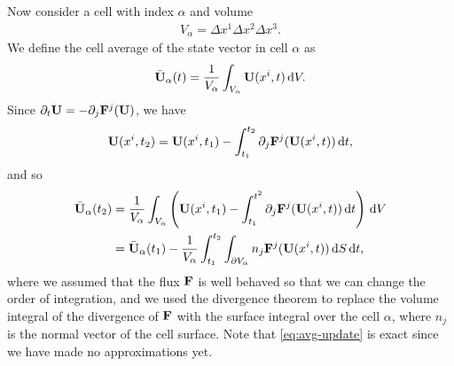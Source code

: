\documentclass{article}
\begin{document}
\newcommand{\dv}{\,\mathrm{d}V}
\newcommand{\ds}{\,\mathrm{d}S}
\newcommand{\dt}{\,\mathrm{d}t}

Now consider a cell with index $\alpha$ and volume
\begin{align}
  V_\alpha = \Delta x^1 \Delta x^2 \Delta x^3.
\end{align}
We define the cell average of the state vector in cell $\alpha$ as
\begin{align}
  \label{eq:cell-average}
  \bar{\vc U}_\alpha(t) = \frac{1}{V_\alpha} \int_{V_\alpha} \vc U(x^i,t) \dv.
\end{align}
Since $\partial_t \mathrm{\bf U} = -\partial_j\mathrm{\bf F}^j(\mathrm{\bf U})$, we have
\begin{align}
  \vc U(x^i,t_2) = \vc U(x^i, t_1) - \int_{t_1}^{t_2} \partial_j \vc F^j(\vc U(x^i,t)) \dt,
\end{align}
and so
\begin{align}
  \label{eq:avg-update}
  \bar{\vc U}_\alpha(t_2) &= \frac{1}{V_\alpha}\int_{V_\alpha} \left( \vc U(x^i,t_1)
    - \int_{t_1}^{t^2} \partial_j \vc F^j(\vc U(x^i, t))\dt \right)\dv
  \nonumber \\
  &= \bar{\vc U}_\alpha(t_1) - \frac{1}{V_\alpha}\int_{t_1}^{t_2}\int_{\partial V_\alpha}
    n_j \vc F^j(\vc U(x^i, t))\ds\dt,
\end{align}
where we assumed that the flux $\mathrm{\bf F}$ is well behaved so that we can change the order of
integration, and
we used the divergence theorem to replace the volume integral of the divergence of $\mathrm{\bf F}$ with the
surface integral over the cell $\alpha$, where $n_j$ is the normal vector of the cell surface. Note
that \cref{eq:avg-update} is exact since we have made no approximations yet.
\end{document}
